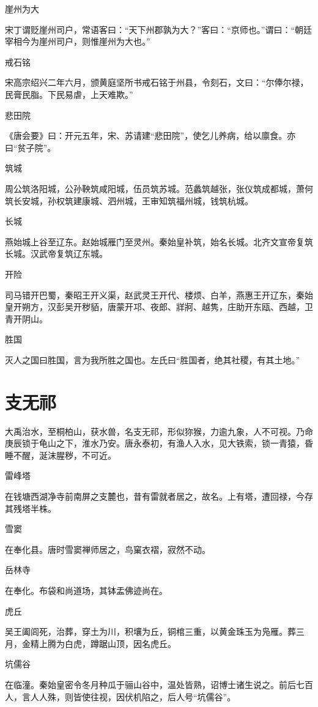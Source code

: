 \documentclass[a4paper,12pt,UTF8,twoside]{ctexbook}
\begin{document}
	崖州为大
	
	宋丁谓贬崖州司户，常语客曰：“天下州郡孰为大？”客曰：“京师也。”谓曰：“朝廷宰相今为崖州司户，则惟崖州为大也。”
	
	戒石铭
	
	宋高宗绍兴二年六月，颁黄庭坚所书戒石铭于州县，令刻石，文曰：“尔俸尔禄，民膏民脂。下民易虐，上天难欺。”
	
	悲田院
	
	《唐会要》曰：开元五年，宋、苏请建“悲田院”，使乞儿养病，给以廪食。亦曰“贫子院”。
	
	筑城
	
	周公筑洛阳城，公孙鞅筑咸阳城，伍员筑苏城。范蠡筑越张，张仪筑成都城，萧何筑长安城，孙权筑建康城、泗州城，王审知筑福州城，钱筑杭城。
	
	长城
	
	燕始城上谷至辽东。赵始城雁门至灵州。秦始皇补筑，始名长城。北齐文宣帝复筑长城。汉武帝复筑辽东城。
	
	开险
	
	司马错开巴蜀，秦昭王开义渠，赵武灵王开代、楼烦、白羊，燕惠王开辽东，秦始皇开朔方，汉彭吴开秽貊，唐蒙开邛、夜郎、牂牁、越隽，庄助开东瓯、西越，卫青开阴山。
	
	胜国
	
	灭人之国曰胜国，言为我所胜之国也。左氏曰“胜国者，绝其社稷，有其土地。”
	
	\section{支无祁}
	
	大禹治水，至桐柏山，获水兽，名支无祁，形似狝猴，力逾九象，人不可视。乃命庚辰锁于龟山之下，淮水乃安。唐永泰初，有渔人入水，见大铁索，锁一青猿，昏睡不醒，涎沫腥秽，不可近。
	
	雷峰塔
	
	在钱塘西湖净寺前南屏之支麓也，昔有雷就者居之，故名。上有塔，遭回禄，今存其残塔半株。
	
	雪窦
	
	在奉化县。唐时雪窦禅师居之，鸟窠衣褶，寂然不动。
	
	岳林寺
	
	在奉化。布袋和尚道场，其钵盂佛迹尚在。
	
	虎丘
	
	吴王阖闾死，治葬，穿土为川，积壤为丘，铜棺三重，以黄金珠玉为凫雁。葬三月，金精上腾为白虎，蹲踞山顶，因名虎丘。
	
	坑儒谷
	
	在临潼。秦始皇密令冬月种瓜于骊山谷中，温处皆熟，诏博士诸生说之。前后七百人，言人人殊，则皆使往视，因伏机陷之，后人号“坑儒谷”。
	
\end{document}
